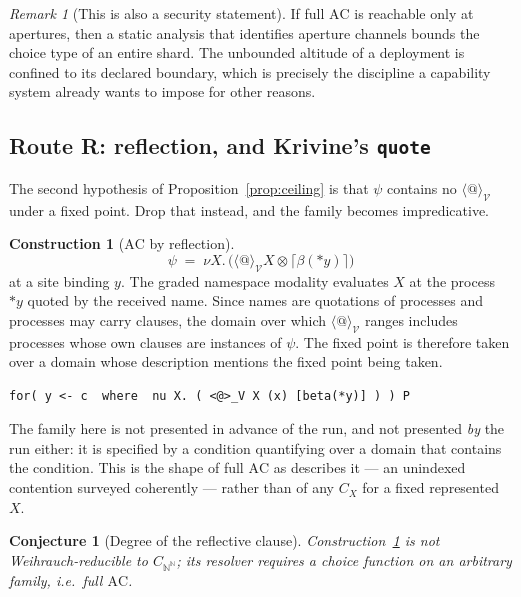 \documentclass[11pt]{article}
\theoremstyle{definition}
\newtheorem{construction}{Construction}
\theoremstyle{plain}
\newtheorem{conjecture}{Conjecture}
\theoremstyle{remark}
\newtheorem{remark}{Remark}
\newcommand{\V}{\mathcal{V}}
\newcommand{\tensorv}{\otimes}
\newcommand{\crisp}[1]{\lceil #1 \rceil}
\newcommand{\AC}{\mathrm{AC}}
\newcommand{\Bai}{\mathbb{N}^{\mathbb{N}}}
\begin{document}
\begin{remark}[This is also a security statement]
If full $\AC$ is reachable only at apertures, then a static analysis that identifies
aperture channels bounds the choice type of an entire shard. The unbounded altitude of
a deployment is confined to its declared boundary, which is precisely the discipline a
capability system already wants to impose for other reasons.
\end{remark}

\subsection{Route R: reflection, and Krivine's \texttt{quote}}\label{ssec:reflection}

The second hypothesis of Proposition~\ref{prop:ceiling} is that $\psi$ contains no
$\langle @ \rangle_\V$ under a fixed point. Drop that instead, and the family becomes
impredicative.

\begin{construction}[$\AC$ by reflection]\label{cons:ac-r}
\[
  \psi \;=\; \nu X.\, \big( \langle @ \rangle_\V X \tensorv \crisp{\beta(*y)} \big)
\]
at a site binding $y$. The graded namespace modality evaluates $X$ at the process
$*y$ quoted by the received name. Since names are quotations of processes and processes
may carry clauses, the domain over which $\langle @ \rangle_\V$ ranges includes
processes whose own clauses are instances of $\psi$. The fixed point is therefore taken
over a domain whose description mentions the fixed point being taken.
\end{construction}

\begin{lstlisting}
for( y <- c  where  nu X. ( <@>_V X (x) [beta(*y)] ) ) P
\end{lstlisting}

The family here is not presented in advance of the run, and not presented \emph{by} the
run either: it is specified by a condition quantifying over a domain that contains the
condition. This is the shape of full $\AC$ as \cite{choicesched} describes it --- an
unindexed contention surveyed coherently --- rather than of any $C_X$ for a fixed
represented $X$.

\begin{conjecture}[Degree of the reflective clause]\label{conj:refl}
Construction~\ref{cons:ac-r} is not Weihrauch-reducible to $C_{\Bai}$; its resolver
requires a choice function on an arbitrary family, i.e.\ full $\AC$.
\end{conjecture}
\end{document}

